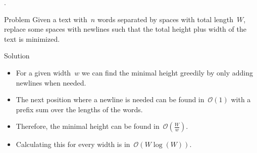 \begin{frame}{.}
	\begin{block}{Problem}
		Given a text with~$n$ words separated by spaces with total length~$W$, replace some spaces with newlines such that the total height plus width of the text is minimized.
	\end{block}
	\pause
	\begin{block}{Solution}
		\begin{itemize}
			\item For a given width~$w$ we can find the minimal height greedily by only adding newlines when needed.
      \item The next position where a newline is needed can be found in~$\mathcal{O}(1)$ with a prefix sum over the lengths of the words.
			\item Therefore, the minimal height can be found in~$\mathcal{O}(\frac{W}{w})$.
			\pause
			\item Calculating this for every width is in~$\mathcal{O}(W\log(W))$.
		\end{itemize}
	\end{block}
\end{frame}
